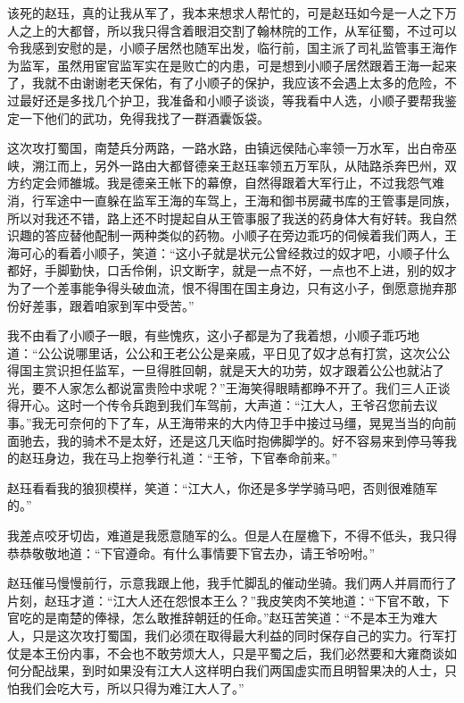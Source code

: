 该死的赵珏，真的让我从军了，我本来想求人帮忙的，可是赵珏如今是一人之下万人之上的大都督，所以我只得含着眼泪交割了翰林院的工作，从军征蜀，不过可以令我感到安慰的是，小顺子居然也随军出发，临行前，国主派了司礼监管事王海作为监军，虽然用宦官监军实在是败亡的内患，可是想到小顺子居然跟着王海一起来了，我就不由谢谢老天保佑，有了小顺子的保护，我应该不会遇上太多的危险，不过最好还是多找几个护卫，我准备和小顺子谈谈，等我看中人选，小顺子要帮我鉴定一下他们的武功，免得我找了一群酒囊饭袋。

这次攻打蜀国，南楚兵分两路，一路水路，由镇远侯陆心率领一万水军，出白帝巫峡，溯江而上，另外一路由大都督德亲王赵珏率领五万军队，从陆路杀奔巴州，双方约定会师雒城。我是德亲王帐下的幕僚，自然得跟着大军行止，不过我怨气难消，行军途中一直躲在监军王海的车驾上，王海和御书房藏书库的王管事是同族，所以对我还不错，路上还不时提起自从王管事服了我送的药身体大有好转。我自然识趣的答应替他配制一两种类似的药物。小顺子在旁边乖巧的伺候着我们两人，王海可心的看着小顺子，笑道：“这小子就是状元公曾经救过的奴才吧，小顺子什么都好，手脚勤快，口舌伶俐，识文断字，就是一点不好，一点也不上进，别的奴才为了一个差事能争得头破血流，恨不得围在国主身边，只有这小子，倒愿意抛弃那份好差事，跟着咱家到军中受苦。”

我不由看了小顺子一眼，有些愧疚，这小子都是为了我着想，小顺子乖巧地道：“公公说哪里话，公公和王老公公是亲戚，平日见了奴才总有打赏，这次公公得国主赏识担任监军，一旦得胜回朝，就是天大的功劳，奴才跟着公公也就沾了光，要不人家怎么都说富贵险中求呢？”王海笑得眼睛都睁不开了。我们三人正谈得开心。这时一个传令兵跑到我们车驾前，大声道：“江大人，王爷召您前去议事。”我无可奈何的下了车，从王海带来的大内侍卫手中接过马缰，晃晃当当的向前面驰去，我的骑术不是太好，还是这几天临时抱佛脚学的。好不容易来到停马等我的赵珏身边，我在马上抱拳行礼道：“王爷，下官奉命前来。”

赵珏看看我的狼狈模样，笑道：“江大人，你还是多学学骑马吧，否则很难随军的。”

我差点咬牙切齿，难道是我愿意随军的么。但是人在屋檐下，不得不低头，我只得恭恭敬敬地道：“下官遵命。有什么事情要下官去办，请王爷吩咐。”

赵珏催马慢慢前行，示意我跟上他，我手忙脚乱的催动坐骑。我们两人并肩而行了片刻，赵珏才道：“江大人还在怨恨本王么？”我皮笑肉不笑地道：“下官不敢，下官吃的是南楚的俸禄，怎么敢推辞朝廷的任命。”赵珏苦笑道：“不是本王为难大人，只是这次攻打蜀国，我们必须在取得最大利益的同时保存自己的实力。行军打仗是本王份内事，不会也不敢劳烦大人，只是平蜀之后，我们必然要和大雍商谈如何分配战果，到时如果没有江大人这样明白我们两国虚实而且明智果决的人士，只怕我们会吃大亏，所以只得为难江大人了。”

